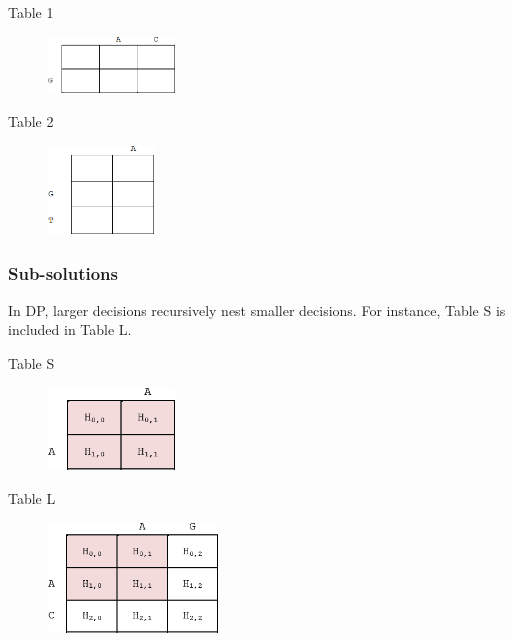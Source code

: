 \begin{multicols}{2}
Table 1
\begin{figure}[H]
  \centering
      \includegraphics[width=0.3\textwidth]{fig02/global_alignment_exercise1.png}
\end{figure}

\vfill\null
\columnbreak

Table 2
\begin{figure}[H]
  \centering
      \includegraphics[width=0.25\textwidth]{fig02/global_alignment_exercise2.png}
\end{figure}

\end{multicols} 

%
%
\subsubsection*{Sub-solutions}

In DP, larger decisions recursively nest smaller decisions. For instance, Table S is included in Table L.

\begin{multicols}{2}
Table S
\begin{figure}[H]
  \centering
      \includegraphics[width=0.3\textwidth]{fig02/dynamic_programmoing_subsolution_S.png}
\end{figure}

\vfill\null
\columnbreak

Table L
\begin{figure}[H]
  \centering
      \includegraphics[width=0.4\textwidth]{fig02/dynamic_programmoing_subsolution_L.png}
\end{figure}

\end{multicols} 


